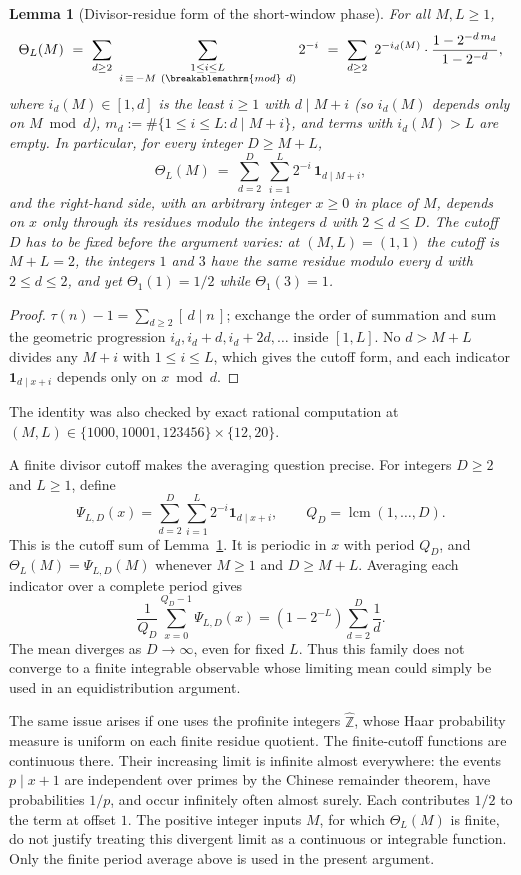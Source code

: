 \documentclass[11pt]{article}
\theoremstyle{plain}
\newtheorem{lem}[thm]{Lemma}
\theoremstyle{definition}
\theoremstyle{remark}
\renewcommand{\mathrm}[1]{\ifmmode\breakablemathrm{#1}\else\textrm{#1}\fi}%
\begin{document}
\begin{lem}[Divisor-residue form of the short-window phase]
\label{lem:odometer}
For all $M,L\ge 1$,
\[
\Theta_L(M)\ =\ \sum_{d\ge 2}\ \sum_{\substack{1\le i\le L\\ i\,\equiv\,-M\ (\mathrm{mod}\ d)}} 2^{-i}
\ =\ \sum_{d\ge 2}\ 2^{-i_d(M)}\cdot\frac{1-2^{-d\,m_d}}{1-2^{-d}},
\]
where $i_d(M)\in[1,d]$ is the least $i\ge1$ with $d\mid M+i$ (so $i_d(M)$ depends only on
$M \bmod d$), $m_d := \#\{1\le i\le L: d\mid M+i\}$, and terms with $i_d(M)>L$ are empty. In
particular, for every integer $D\ge M+L$,
\[
\Theta_L(M)\ =\ \sum_{d=2}^{D}\ \sum_{i=1}^{L} 2^{-i}\,\mathbf 1_{d\mid M+i},
\]
and the right-hand side, with an arbitrary integer $x\ge0$ in place of $M$, depends on $x$ only
through its residues modulo the integers $d$ with $2\le d\le D$. The cutoff $D$ has to be fixed
before the argument varies: at $(M,L)=(1,1)$ the cutoff is $M+L=2$, the integers $1$ and $3$ have
the same residue modulo every $d$ with $2\le d\le 2$, and yet $\Theta_1(1)=1/2$ while
$\Theta_1(3)=1$.
\end{lem}
\begin{proof}
$\tau(n)-1=\sum_{d\ge2}[\,d\mid n\,]$; exchange the order of summation and sum the geometric
progression $i_d, i_d+d, i_d+2d,\dots$ inside $[1,L]$. No $d>M+L$ divides any $M+i$ with
$1\le i\le L$, which gives the cutoff form, and each indicator $\mathbf 1_{d\mid x+i}$ depends
only on $x \bmod d$.
\end{proof}
The identity was also checked by exact rational computation at
$(M,L)\in\{1000,10001,123456\}\times\{12,20\}$.

A finite divisor cutoff makes the averaging question precise.  For
integers $D\ge2$ and $L\ge1$, define
\[
 \Psi_{L,D}(x)=\sum_{d=2}^{D}\sum_{i=1}^{L}2^{-i}
                  \mathbf1_{d\mid x+i},\qquad
 Q_D=\operatorname{lcm}(1,\ldots,D).
\]
This is the cutoff sum of Lemma~\ref{lem:odometer}.  It is periodic in $x$
with period $Q_D$, and
$\Theta_L(M)=\Psi_{L,D}(M)$ whenever $M\ge1$ and $D\ge M+L$.
Averaging each indicator over a complete period gives
\[
 \frac1{Q_D}\sum_{x=0}^{Q_D-1}\Psi_{L,D}(x)
   =(1-2^{-L})\sum_{d=2}^{D}\frac1d.
\]
The mean diverges as $D\to\infty$, even for fixed $L$.
Thus this family does not converge to a finite integrable observable
whose limiting mean could simply be used in an equidistribution
argument.

The same issue arises if one uses the profinite integers
$\widehat{\mathbb Z}$, whose Haar probability measure is uniform
on each finite residue quotient.  The finite-cutoff functions are
continuous there.  Their increasing limit is infinite almost
everywhere: the events $p\mid x+1$ are independent over primes by
the Chinese remainder theorem, have probabilities $1/p$, and occur
infinitely often almost surely.  Each contributes $1/2$ to the
term at offset $1$.  The positive integer inputs $M$, for which
$\Theta_L(M)$ is finite, do not justify treating this divergent
limit as a continuous or integrable function.  Only the finite
period average above is used in the present argument.
\end{document}
